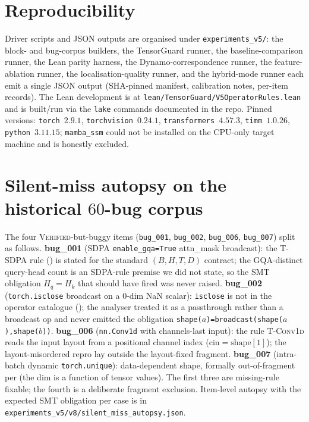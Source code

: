 



\section{Reproducibility}\label{app:repro}
Driver scripts and JSON outputs are organised under
\texttt{experiments\_v5/}: the block- and bug-corpus builders,
the TensorGuard runner, the baseline-comparison runner, the
Lean parity harness, the Dynamo-correspondence runner, the
feature-ablation runner, the localisation-quality runner, and
the hybrid-mode runner each emit a single JSON output
(SHA-pinned manifest, calibration notes, per-item records). The
Lean development is at \texttt{lean/TensorGuard/V5OperatorRules.lean}
and is built/run via the \texttt{lake} commands documented in
the repo. Pinned versions: \texttt{torch}~$2.9.1$,
\texttt{torchvision}~$0.24.1$, \texttt{transformers}~$4.57.3$,
\texttt{timm}~$1.0.26$, \texttt{python}~$3.11.15$;
\texttt{mamba\_ssm} could not be installed on the CPU-only
target machine and is honestly excluded.

\section{Silent-miss autopsy on the historical $60$-bug corpus}
\label{app:silent-miss}
The four \textsc{Verified}-but-buggy items
(\texttt{bug\_001}, \texttt{bug\_002}, \texttt{bug\_006},
\texttt{bug\_007}) split as follows.
\textbf{bug\_001} (SDPA \texttt{enable\_gqa=True} attn\_mask
broadcast): the \textsc{T-SDPA} rule ()
is stated for the standard $(B,H,T,D)$ contract; the
GQA-distinct query-head count is an SDPA-rule premise we did
not state, so the SMT obligation $H_q=H_k$ that should have
fired was never raised.
\textbf{bug\_002} (\texttt{torch.isclose} broadcast on a
$0$-dim NaN scalar): \texttt{isclose} is not in the operator
catalogue (); the analyser treated it
as a passthrough rather than a broadcast op and never emitted
the obligation \texttt{shape($a$)=broadcast(shape($a$),shape($b$))}.
\textbf{bug\_006} (\texttt{nn.Conv1d}
with channels-last input): the rule \textsc{T-Conv1d} reads the
input layout from a positional channel index ($\mathrm{cin}=
\mathrm{shape}[1]$); the layout-misordered repro lay outside
the layout-fixed fragment.
\textbf{bug\_007} (intra-batch dynamic
\texttt{torch.unique}): data-dependent shape, formally
out-of-fragment per
 (the dim is a function of tensor values).
The first three are missing-rule fixable; the fourth is a
deliberate fragment exclusion. Item-level autopsy with the
expected SMT obligation per case is in
\texttt{experiments\_v5/v8/silent\_miss\_autopsy.json}.

